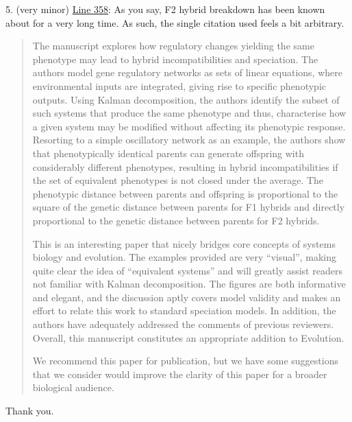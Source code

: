 \reply{
}

\begin{point}{}
  5. (very minor) \hyperlink{rev1:6}{Line 358}: As you say, F2 hybrid breakdown has been known about for a very long time. As such, the single citation used feels a bit arbitrary.
\end{point}


\begin{quote}
The manuscript explores how regulatory changes yielding the same phenotype may lead to hybrid incompatibilities and speciation. The authors model gene regulatory networks as sets of linear equations, where environmental inputs are integrated, giving rise to specific phenotypic outputs. Using Kalman decomposition, the authors identify the subset of such systems that produce the same phenotype and thus, characterise how a given system may be modified without affecting its phenotypic response. Resorting to a simple oscillatory network as an example, the authors show that phenotypically identical parents can generate offspring with considerably different phenotypes, resulting in hybrid incompatibilities if the set of equivalent phenotypes is not closed under the average. The phenotypic distance between parents and offspring is proportional to the square of the genetic distance between parents for F1 hybrids and directly proportional to the genetic distance between parents for F2 hybrids.

This is an interesting paper that nicely bridges core concepts of systems biology and evolution. The examples provided are very ``visual'', making quite clear the idea of ``equivalent systems'' and will greatly assist readers not familiar with Kalman decomposition. The figures are both informative and elegant, and the discussion aptly covers model validity and makes an effort to relate this work to standard speciation models. In addition, the authors have adequately addressed the comments of previous reviewers. Overall, this manuscript constitutes an appropriate addition to Evolution.

We recommend this paper for publication, but we have some suggestions that we consider would improve the clarity of this paper for a broader biological audience.
\end{quote}

Thank you. 

